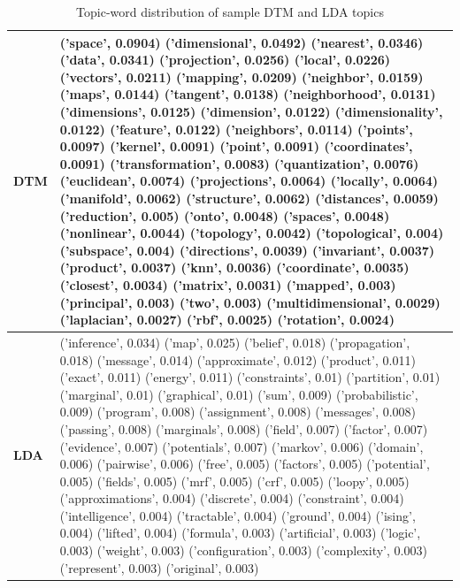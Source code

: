 \documentclass[a4paper]{report}
\begin{document}
\begin{table}[ht!]
\begin{tabular}{|p{1cm}|p{13cm}|}
\hline \textbf{DTM}  &
('space', 0.0904)	('dimensional', 0.0492)	('nearest', 0.0346)	('data', 0.0341)	('projection', 0.0256)	('local', 0.0226)	('vectors', 0.0211)	('mapping', 0.0209)	('neighbor', 0.0159)	('maps', 0.0144)	('tangent', 0.0138)	('neighborhood', 0.0131)	('dimensions', 0.0125)	('dimension', 0.0122)	('dimensionality', 0.0122)	('feature', 0.0122)	('neighbors', 0.0114)	('points', 0.0097)	('kernel', 0.0091)	('point', 0.0091)	('coordinates', 0.0091)	('transformation', 0.0083)	('quantization', 0.0076)	('euclidean', 0.0074)	('projections', 0.0064)	('locally', 0.0064)	('manifold', 0.0062)	('structure', 0.0062)	('distances', 0.0059)	('reduction', 0.005)	('onto', 0.0048)	('spaces', 0.0048)	('nonlinear', 0.0044)	('topology', 0.0042)	('topological', 0.004)	('subspace', 0.004)	('directions', 0.0039)	('invariant', 0.0037)	('product', 0.0037)	('knn', 0.0036)	('coordinate', 0.0035)	('closest', 0.0034)	('matrix', 0.0031)	('mapped', 0.003)	('principal', 0.003)	('two', 0.003)	('multidimensional', 0.0029)	('laplacian', 0.0027)	('rbf', 0.0025)	('rotation', 0.0024) \\ \hline

\textbf{LDA} &
('inference', 0.034)	('map', 0.025)	('belief', 0.018)	('propagation', 0.018)	('message', 0.014)	('approximate', 0.012)	('product', 0.011)	('exact', 0.011)	('energy', 0.011)	('constraints', 0.01)	('partition', 0.01)	('marginal', 0.01)	('graphical', 0.01)	('sum', 0.009)	('probabilistic', 0.009)	('program', 0.008)	('assignment', 0.008)	('messages', 0.008)	('passing', 0.008)	('marginals', 0.008)	('field', 0.007)	('factor', 0.007)	('evidence', 0.007)	('potentials', 0.007)	('markov', 0.006)	('domain', 0.006)	('pairwise', 0.006)	('free', 0.005)	('factors', 0.005)	('potential', 0.005)	('fields', 0.005)	('mrf', 0.005)	('crf', 0.005)	('loopy', 0.005)	('approximations', 0.004)	('discrete', 0.004)	('constraint', 0.004)	('intelligence', 0.004)	('tractable', 0.004)	('ground', 0.004)	('ising', 0.004)	('lifted', 0.004)	('formula', 0.003)	('artificial', 0.003)	('logic', 0.003)	('weight', 0.003)	('configuration', 0.003)	('complexity', 0.003)	('represent', 0.003)	('original', 0.003) \\ \hline

\end{tabular}
\caption{Topic-word distribution of sample DTM and LDA topics}
\label{table:topicDistribution}
\end{table}
\end{document}
